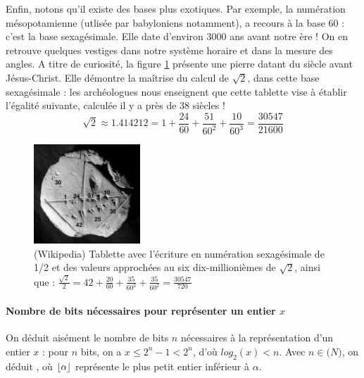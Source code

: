 Enfin, notons qu'il existe des bases plus exotiques. Par exemple, la numération mésopotamienne (utlisée par babyloniens notamment),
a recours à la base 60 : c'est la base sexagésimale. Elle date d'environ 3000 ans avant notre ère ! On en retrouve quelques vestiges dans notre système horaire et dans la mesure des angles.
A titre de curiosité, la figure \ref{sexa} présente une pierre datant du  siècle avant Jésus-Christ.
Elle démontre la maîtrise du calcul de $\sqrt 2$, dans cette base sexagésimale : les archéologues nous enseignent que cette tablette
vise à établir l'égalité suivante, calculée il y a près de 38 siècles !
$$\sqrt 2 \approx 1.414212=1+\frac{24}{60}+\frac{51}{60^2}+\frac{10}{60^3}=\frac{30547}{21600}$$
\begin{figure}[htb]
  \begin{center}
    \includegraphics[width=4cm]{./figures/Ybc7289-bw.jpg}
    \caption{(Wikipedia) Tablette avec l'écriture en numération sexagésimale de 1/2 et des valeurs approchées au six dix-millionièmes de $\sqrt 2$, ainsi que :
    $\frac{\sqrt 2}{2}=42+\frac{20}{60}+\frac{35}{60^2}+\frac{35}{60^2}=\frac{30547}{720}$}
    \label{sexa}
  \end{center}
\end{figure}

\paragraph{Nombre de bits nécessaires pour représenter un entier $x$}
On déduit aisément le nombre de bits $n$ nécessaires à la représentation d'un entier $x$ :
pour $n$ bits, on a $x \leq 2^n-1 < 2^n$, d'où $log_2(x)<n$.
Avec $n\in \mathbb(N)$, on déduit , où $\floor*{\alpha}$ représente le plus petit entier inférieur à $\alpha$.

